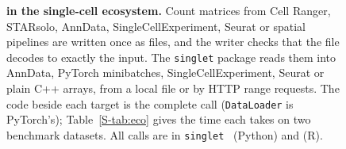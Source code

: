 \begin{figure}[tbp]
{}
\caption{\textbf{\sone{} in the single-cell ecosystem.} Count matrices from Cell Ranger, STARsolo, AnnData,
SingleCellExperiment, Seurat or spatial pipelines are written once as \sone{} files, and the writer checks that the file
decodes to exactly the input. The \texttt{singlet} package reads them into AnnData, PyTorch minibatches,
SingleCellExperiment, Seurat or plain C++ arrays, from a local file or by HTTP range requests. The code beside each
target is the complete call (\texttt{DataLoader} is PyTorch's); Table~\ref{S-tab:eco} gives the time each takes on two
benchmark datasets. All calls are in \texttt{singlet}~ (Python) and  (R).}
\label{fig:eco}
\end{figure}
